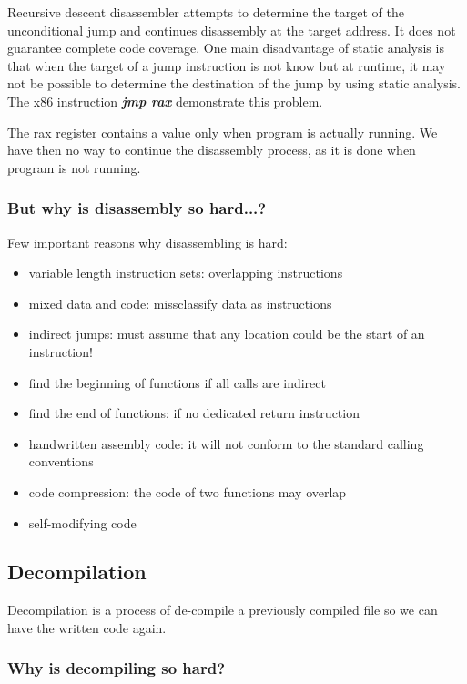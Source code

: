 Recursive descent disassembler attempts to determine the target of the unconditional jump and continues disassembly at the target address. It does not guarantee complete code coverage. 
One main disadvantage of static analysis is that when the target of a jump instruction is not know but at runtime, it may not be possible to determine the destination of the jump by using static analysis. 
The x86 instruction \textbf{\textit{jmp rax}} demonstrate this problem.
\par 
The rax register contains a value only when program is actually running. We have then no way to continue the disassembly process, as it is done when program is not running.

\subsubsection{But why is disassembly so hard...?}
Few important reasons why disassembling is hard: 
\begin{itemize}
    \item variable length instruction sets: overlapping instructions 
    \item mixed data and code: missclassify data as instructions
    \item indirect jumps: must assume that any location could be the start of an instruction! 
    \item find the beginning of functions if all calls are indirect
    \item find the end of functions: if no dedicated return instruction
    \item handwritten assembly code: it will not conform to the standard calling conventions
    \item code compression: the code of two functions may overlap 
    \item self-modifying code
\end{itemize}

\subsection{Decompilation}

Decompilation is a process of de-compile a previously compiled file so we can have the written code again. 

\subsubsection{Why is decompiling so hard?}

